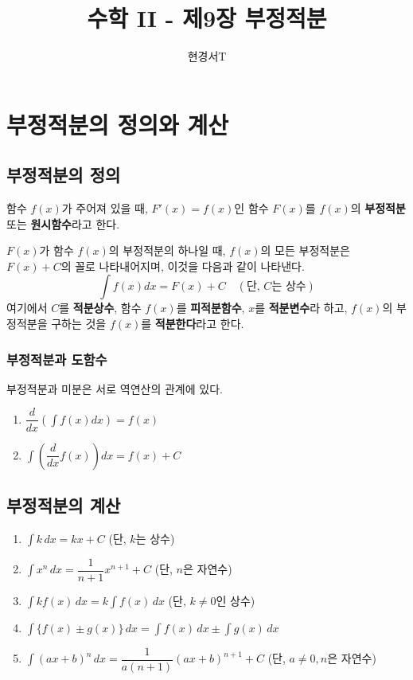 \documentclass[a4paper,11pt]{article}
\title{\textbf{수학 II - 제9장 부정적분}}
\author{현경서T}
\date{}
\begin{document}
\maketitle

\section{부정적분의 정의와 계산}

\subsection{부정적분의 정의}

\begin{conceptbox}
함수 $f(x)$가 주어져 있을 때, $F'(x)=f(x)$인 함수 $F(x)$를 $f(x)$의 \textbf{부정적분} 또는 \textbf{원시함수}라고 한다.

$F(x)$가 함수 $f(x)$의 부정적분의 하나일 때, $f(x)$의 모든 부정적분은 $F(x)+C$의 꼴로 나타내어지며, 이것을 다음과 같이 나타낸다.
\[ \int f(x)dx = F(x) + C \quad (\text{단, } C\text{는 상수}) \]
여기에서 $C$를 \textbf{적분상수}, 함수 $f(x)$를 \textbf{피적분함수}, $x$를 \textbf{적분변수}라 하고, $f(x)$의 부정적분을 구하는 것을 $f(x)$를 \textbf{적분한다}라고 한다.
\end{conceptbox}

\subsubsection*{부정적분과 도함수}
부정적분과 미분은 서로 역연산의 관계에 있다.
\begin{enumerate}
    \item $\dfrac{d}{dx}\left(\int f(x)dx\right) = f(x)$
    \item $\int \left(\dfrac{d}{dx}f(x)\right)dx = f(x) + C$
\end{enumerate}


\subsection{부정적분의 계산}

\begin{conceptbox}
\begin{enumerate}
    \item $\int k \, dx = kx + C$ (단, $k$는 상수)
    \item $\int x^n \, dx = \dfrac{1}{n+1}x^{n+1} + C$ (단, $n$은 자연수)
    \item $\int k f(x) \, dx = k \int f(x) \, dx$ (단, $k \ne 0$인 상수)
    \item $\int \{f(x) \pm g(x)\} \, dx = \int f(x) \, dx \pm \int g(x) \, dx$
    \item $\int (ax+b)^n \, dx = \dfrac{1}{a(n+1)}(ax+b)^{n+1} + C$ (단, $a \ne 0, n$은 자연수)
\end{enumerate}
\end{conceptbox}
\end{document}
